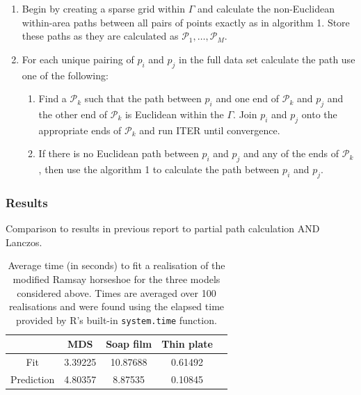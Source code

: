 \documentclass[a4paper,10pt]{article}
\begin{document}
\begin{enumerate}
 \item Begin by creating a sparse grid within $\Gamma$ and calculate the non-Euclidean within-area paths between all pairs of points exactly as in algorithm 1. Store these paths as they are calculated as $\mathcal{P}_1,\ldots, \mathcal{P}_M$.
 
\item For each unique pairing of $p_i$ and $p_j$ in the full data set calculate the path use one of the following:

\begin{enumerate}

\item Find a $\mathcal{P}_k$ such that the path between $p_i$ and one end of $\mathcal{P}_k$ and $p_j$ and the other end of $\mathcal{P}_k$ is Euclidean within the $\Gamma$. Join $p_i$ and $p_j$ onto the appropriate ends of $\mathcal{P}_k$ and run ITER until convergence.

\item If there is no Euclidean path between $p_i$ and $p_j$ and any of the ends of $\mathcal{P}_k$, then use the algorithm 1 to calculate the path between $p_i$ and $p_j$. 

\end{enumerate}
\end{enumerate}


\subsubsection{Results}

Comparison to results in previous report to partial path calculation AND Lanczos.


\begin{table}[ht]
\centering
\begin{tabular}{c || c c c c}
 & MDS & Soap film & Thin plate\\ 
\hline
Fit & 3.39225 & 10.87688 & 0.61492\\
Prediction & 4.80357 & 8.87535 & 0.10845\\
\end{tabular}
\label{ramsaytime}
\caption{Average time (in seconds) to fit a realisation of the modified Ramsay horseshoe for the three models considered above. Times are averaged over 100 realisations and were found using the elapsed time provided by \textsf{R}'s built-in \texttt{system.time} function.}
\end{table}
\end{document}
